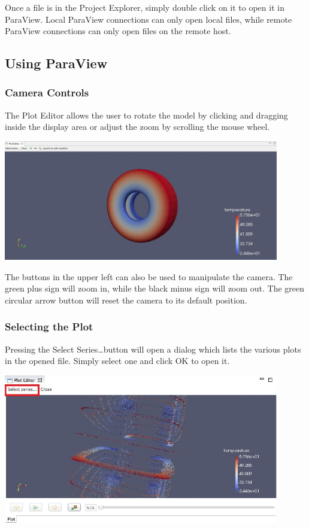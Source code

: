 Once a file is in the Project Explorer, simply double click on it to open it in
ParaView. Local ParaView connections can only open local files, while remote ParaView connections can only open files on the remote host.

\subsection{Using ParaView}

\subsubsection{Camera Controls}

The Plot Editor allows the user to rotate the model by clicking and dragging
inside the display area or adjust the zoom by scrolling the mouse wheel.

\begin{center}
\includegraphics[width=12cm]{images/ParaViewPlotEditor}
\end{center}

The buttons in the upper left can also be used to manipulate the camera. The green plus sign will zoom in, while the black minus sign will zoom out. The green circular arrow button will reset the camera to its default position.

\subsubsection{Selecting the Plot}

Pressing the Select Series\ldots button will open a dialog which lists the
various plots in the opened file. Simply select one and click OK to open it. 

\begin{center}
\includegraphics[width=12cm]{images/ParaViewPlotEditorSelectSeriesButton}
\end{center}

